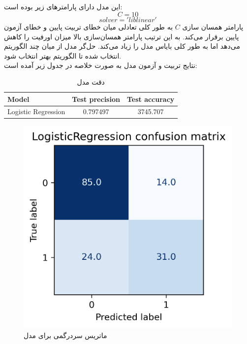 \documentclass[11pt]{article}
\begin{document}
	\subsection{}
		این مدل دارای پارامترهای زیر بوده است:
		$$C = 10$$
		$$solver = 'liblinear'$$
		پارامتر همسان سازی $C$ به طور کلی تعادلی میان خطای تربیت پایین و خطای آزمون پایین برقرار می‌کند. به این ترتیب پارامتر همسان‌سازی بالا میزان اورفیت را کاهش می‌دهد اما به طور کلی بایاس مدل را زیاد می‌کند. حل‌‌گر مدل از میا‌ن چند الگوریتم انتخاب شده تا الگوریتم بهتر انتخاب شود.\\
		نتایج تربیت و آزمون مدل به صورت خلاصه در جدول زیر آمده است:
		\begin{table}[h!]
			\caption{دقت مدل }
			\begin{latin}
				\centering
				\begin{tabular}{|l|c|c|}
					\hline
					\textbf{Model} & \textbf{Test precision} & \textbf{Test accuracy} \\ \hline
					Logistic Regression & 0.797497 & 3745.707 \\ \hline
				\end{tabular}
			\end{latin}
			\label{tab:logisticregression_results}
		\end{table}
		\begin{figure}[!h]
			\centerline{\includegraphics[width=0.5\linewidth]{../HW2_2/LogisticRegression confusion.png}}
			\caption{ماتریس سردرگمی برای مدل }
			\label{fig:confusion_logistic}
		\end{figure}
		\pagebreak
\end{document}
